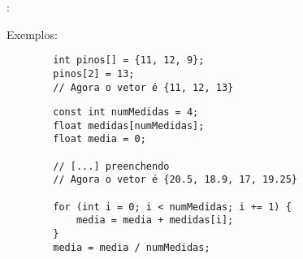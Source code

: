 \begin{frame}[fragile]{\insertsection: \insertsubsection}

	Exemplos:
	\begin{verbatim}
		int pinos[] = {11, 12, 9};
		pinos[2] = 13;
		// Agora o vetor é {11, 12, 13}
	\end{verbatim}

	\begin{verbatim}
		const int numMedidas = 4;
		float medidas[numMedidas];
		float media = 0;

		// [...] preenchendo
		// Agora o vetor é {20.5, 18.9, 17, 19.25}

		for (int i = 0; i < numMedidas; i += 1) {
			media = media + medidas[i];
		}
		media = media / numMedidas;
	\end{verbatim}

\end{frame}
